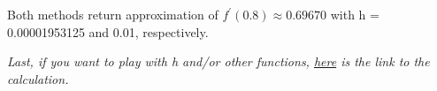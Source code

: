 \begin{exercise}{5}
\begin{longtable}[c]{|r|r|r|}
\label{my-label}\\
\end{longtable}

Both methods return approximation of $f^\prime(0.8) \approx 0.69670$ with h = 0.00001953125 and 0.01, respectively.

\textit{Last, if you want to play with h and/or other functions, \href{http://bit.ly/2ntOy2m}{here} is the link to the calculation.}
\end{exercise}
 